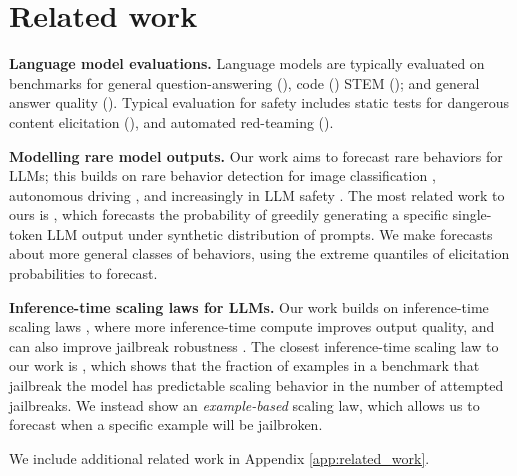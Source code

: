 \section{Related work}
\label{sec:related-work}

\textbf{Language model evaluations.} Language models are typically evaluated on benchmarks for general question-answering (\citet{hendrycks2021measuringmassivemultitasklanguage, mmlu_pro, simpleqa, phan2025humanitysexam}), code (\citet{jimenez2024swebenchlanguagemodelsresolve, sweverified, jain2024livecodebench}) STEM (\citet{rein2023gpqagraduatelevelgoogleproofqa, AIME2024}); and general answer quality (\citet{alpaca2.0, li2024crowdsourced}). Typical evaluation for safety includes static tests for dangerous content elicitation (\citet{shevlane2023modelevaluationextremerisks, phuong2024evaluatingfrontiermodelsdangerous}), and automated red-teaming (\citet{brundage2020trustworthyaidevelopmentmechanisms, perez2022redteaminglanguagemodels, ganguli2022red, feffer2024redteaminggenerativeaisilver}). 

\textbf{Modelling rare model outputs.} Our work aims to forecast rare behaviors for LLMs; this builds on rare behavior detection for image classification \citep{webb2019statisticalapproachassessingneural}, autonomous driving \citep{uesato2018rigorousagentevaluationadversarial}, and increasingly in LLM safety \citep{hoffmann2022training,phuong2024evaluatingfrontiermodelsdangerous}. The most related work to ours is \citet{wu2024estimating}, which forecasts the probability of greedily generating a specific single-token LLM output under synthetic distribution of prompts. 
We make forecasts about more general classes of behaviors, using the extreme quantiles of elicitation probabilities to forecast. 

\textbf{Inference-time scaling laws for LLMs.} Our work builds on inference-time scaling laws \citep{brown2024largelanguagemonkeysscaling, snell2024scaling}, where more inference-time compute improves output quality, and can also improve jailbreak robustness \citep{wen2024adaptivedeploymentuntrustedllms, zaremba2025adversarial}. The closest inference-time scaling law to our work is \citet{hughes2024bestofnjailbreaking}, which shows that the fraction of examples in a benchmark that jailbreak the model has predictable scaling behavior in the number of attempted jailbreaks. 
We instead show an \emph{example-based} scaling law, which allows us to forecast when a specific example will be jailbroken. 

We include additional related work in Appendix \ref{app:related_work}. %